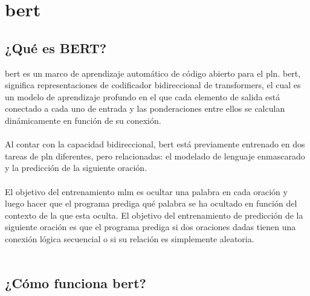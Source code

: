 \documentclass[12pt, a4paper, titlepage]{report}
\begin{document}
        \section{\acrshort{bert}}
		        \subsection{¿Qué es BERT?}
		        \acrfull{bert} es un marco de aprendizaje automático de código abierto para el \acrfull{pln}. \acrshort{bert}, significa representaciones de codificador bidireccional de transformers, el cual es un modelo de aprendizaje profundo en el que cada elemento de salida está conectado a cada uno de entrada y las ponderaciones entre ellos se calculan dinámicamente en función de su conexión. \cite{refQueesBert} \\\\        
		        Al contar con la capacidad bidireccional, \acrshort{bert} está previamente entrenado en dos tareas de \acrshort{pln} diferentes, pero relacionadas: el modelado de lenguaje enmascarado y la predicción de la siguiente oración.\\\\        
		        El objetivo del entrenamiento \acrfull{mlm} es ocultar una palabra en cada oración y luego hacer que el programa prediga qué palabra se ha ocultado en función del contexto de la que esta oculta. El objetivo del entrenamiento de predicción de la siguiente oración es que el programa prediga si dos oraciones dadas tienen una conexión lógica secuencial o si su relación es simplemente aleatoria.\\\\
		        
		        \subsection{¿Cómo funciona \acrshort{bert}?}
		        
\end{document}

